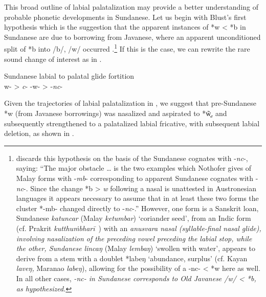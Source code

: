 \documentclass[output=paper]{langscibook}
\begin{document}
This broad outline of labial palatalization may provide a better understanding of probable phonetic developments in Sundanese. Let us begin with Blust’s first hypothesis which is the suggestion that the apparent instances of *w < *b in Sundanese are due to borrowing from Javanese, where an apparent unconditioned split of *b into \mbox{/b/}, \mbox{/w/} occurred \citep[239]{Blust2005}.\footnote{\citet[239]{Blust2005} discards this hypothesis on the basis of the Sundanese cognates with \mbox{-\textit{nc}-,} saying: “The major obstacle … is the two examples which Nothofer gives of Malay forms with -\textit{mb}- corresponding to apparent Sundanese cognates with -\textit{nc}-. Since the change *b > \textit{w} following a nasal is unattested in Austronesian languages it appears necessary to assume that in at least these two forms the cluster *-mb- changed directly to -\textit{nc}-.” However, one form is a Sanskrit loan, Sundanese \textit{katuncar} (Malay \textit{ketumbar}) ‘coriander seed’, from an Indic form (cf. Prakrit \textit{kutthuṁbharī}~) with an \emph{anusvara \textup{nasal (syllable-final nasal glide), involving nasalization of the preceding vowel preceding the labial stop, while the other, Sundanese} }\textit{lincaŋ} (Malay \textit{lembaŋ}) ‘swollen with water’, appears to derive from a stem with a doublet *labeŋ ‘abundance, surplus’ (cf. Kayan \textit{laveŋ,} Maranao \textit{labeŋ}), allowing for the possibility of a -nc- < *w here as well. In all other cases, \emph{\textup{-}nc\textup{- in Sundanese corresponds to Old Javanese \mbox{/w/} < *b, as hypothesized.} }} If this is the case, we can rewrite the rare sound change of interest as in .

\ea%
    Sundanese labial to palatal glide fortition\\\label{ex:blevins:18}
    \ea *w- > \textit{c}-
    \ex *-w-  > -\textit{nc}-
    \z
\z

Given the trajectories of labial palatalization in , we suggest that pre-Sundanese *w (from Javanese borrowings) was nasalized and aspirated to *w̥̃, and subsequently strengthened to a palatalized labial fricative, with subsequent labial deletion, as shown in .
\end{document}
